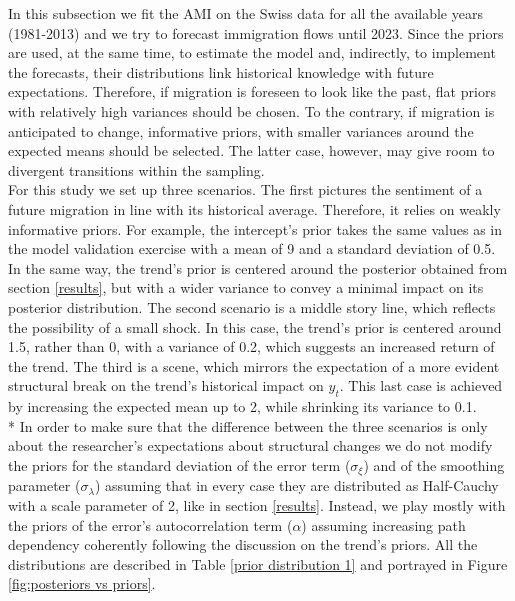 \documentclass{article}\usepackage[]{graphicx}\usepackage[]{color}
\begin{document}
In this subsection we fit the AMI on the Swiss data for all the available years (1981-2013) and we try to forecast immigration flows until 2023. %
Since the priors are used, at the same time, to estimate the model and, indirectly, to implement the forecasts, their distributions link historical knowledge with future expectations. Therefore, if migration is foreseen to look like the past, flat priors with relatively high variances should be chosen. To the contrary, if migration is anticipated to change, informative priors, with smaller variances around the expected means should be selected. The latter case, however, may give room to divergent transitions within the sampling. \\ 
For this study we set up three scenarios. The first pictures the sentiment of a future migration in line with its historical average.
Therefore, it relies on weakly informative priors. For example, the intercept's prior takes the same values as in the model validation exercise with a mean of 9 and a standard deviation of 0.5. In the same way, the trend's prior is centered around the posterior obtained from section \ref{results}, but with a wider variance to convey a minimal impact on its posterior distribution. 
The second scenario is a middle story line, which reflects the possibility of a small shock. In this case, the trend's prior is centered around 1.5, rather than 0, with a variance of 0.2, which suggests an increased return of the trend. 
The third is a scene, which mirrors the expectation of a more evident structural break on the trend's historical impact on $y_{t}$. This last case is achieved by increasing the expected mean up to 2, while shrinking its variance to 0.1.   \\*
In order to make sure that the difference between the three scenarios is only about the researcher's expectations about structural changes we do not modify the priors for the standard deviation of the error term ($\sigma_{\xi}$) and of the smoothing parameter ($\sigma_{\lambda}$) assuming that in every case they are distributed as Half-Cauchy with a scale parameter of 2, like in section \ref{results}.
Instead, we play mostly with the priors of the error's autocorrelation term ($\alpha$) assuming increasing path dependency coherently following the discussion on the trend's priors. 
All the distributions are described in Table \ref{prior distribution 1} and portrayed in Figure \ref{fig:posteriors vs priors}.
\end{document}
